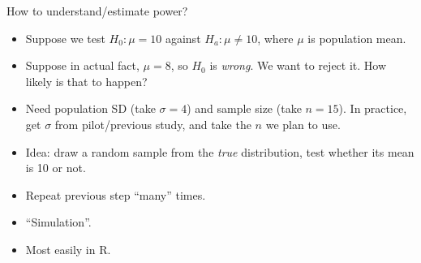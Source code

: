 \documentclass[unknownkeysallowed]{beamer}\usepackage[]{graphicx}\usepackage[]{color}
\begin{document}
\begin{frame}[fragile]{How to understand/estimate power?}
  
  \begin{itemize}
  \item Suppose we test $H_0: \mu=10$ against $H_a: \mu \ne 10$, where
    $\mu$ is population mean.
  \item Suppose in actual fact, $\mu=8$, so $H_0$ is \emph{wrong}. We
    want to reject it. How likely is that to happen?
  \item Need population SD (take $\sigma=4$) and sample size (take
    $n=15$). In practice, get $\sigma$ from pilot/previous study, and
    take the $n$ we plan to use.
  \item Idea: draw a random sample from the \emph{true} distribution,
    test whether its mean is 10 or not.
  \item Repeat previous step ``many'' times.
    
  \item ``Simulation''.
  \item Most easily in R.
  \end{itemize}
\end{frame}
\end{document}
